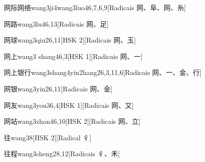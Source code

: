 \begin{entry}{网际网络}{wang3ji4wang3luo4}{6,7,6,9}[Radicais ⽹、⾩、⽹、⽷]
\end{entry}

\begin{entry}{网路}{wang3lu4}{6,13}[Radicais ⽹、⾜]
\end{entry}

\begin{entry}{网球}{wang3qiu2}{6,11}[HSK 2][Radicais ⽹、⽟]
\end{entry}

\begin{entry}{网上}{wang3 shang4}{6,3}[HSK 1][Radicais ⽹、⼀]
\end{entry}

\begin{entry}{网上银行}{wang3shang4yin2hang2}{6,3,11,6}[Radicais ⽹、⼀、⾦、⾏]
\end{entry}

\begin{entry}{网银}{wang3yin2}{6,11}[Radicais ⽹、⾦]
\end{entry}

\begin{entry}{网友}{wang3you3}{6,4}[HSK 1][Radicais ⽹、⼜]
\end{entry}

\begin{entry}{网站}{wang3zhan4}{6,10}[HSK 2][Radicais ⽹、⽴]
\end{entry}

\begin{entry}{往}{wang3}{8}[HSK 2][Radical ⼻]
\end{entry}

\begin{entry}{往程}{wang3cheng2}{8,12}[Radicais ⼻、⽲]
\end{entry}


